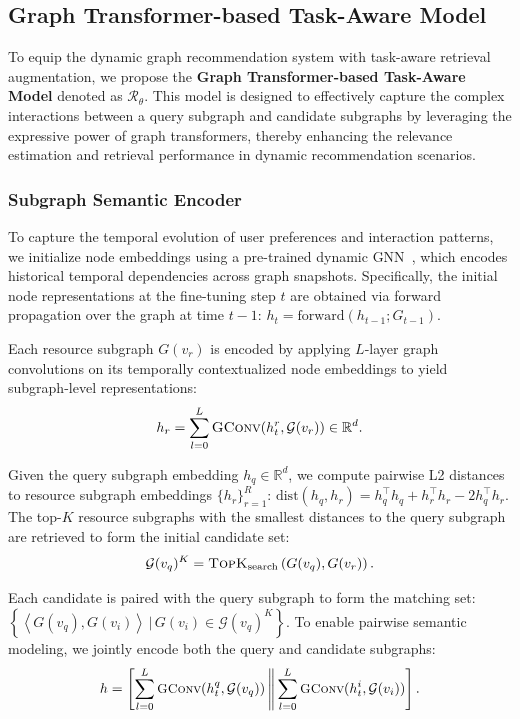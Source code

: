 \documentclass[letterpaper]{article} %
\begin{document}
\subsection{Graph Transformer-based Task-Aware Model}
\label{GTransTAM}
To equip the dynamic graph recommendation system with task-aware retrieval augmentation, we propose the \textbf{Graph Transformer-based Task-Aware Model} denoted as $\mathcal{R}_\theta$. This model is designed to effectively capture the complex interactions between a query subgraph and candidate subgraphs by leveraging the expressive power of graph transformers, thereby enhancing the relevance estimation and retrieval performance in dynamic recommendation scenarios.

\subsubsection{Subgraph Semantic Encoder}
To capture the temporal evolution of user preferences and interaction patterns, we initialize node embeddings using a pre-trained dynamic GNN~\cite{yang2024graphpro}, which encodes historical temporal dependencies across graph snapshots. Specifically, the initial node representations at the fine-tuning step $t$ are obtained via forward propagation over the graph at time $t-1$: ${h}_t = \text{forward}({h}_{t-1}; G_{t-1})$.

Each resource subgraph $G(v_r)$ is encoded by applying $L$-layer graph convolutions on its temporally contextualized node embeddings to yield subgraph-level representations:
\begin{equation}\label{subgraph_rep} 
h_r = \sum_{l=0}^L \textsc{GConv}(h_t^r, \mathcal{G}(v_r)) \in \mathbb{R}^d.
\end{equation}

Given the query subgraph embedding $h_q \in \mathbb{R}^d$, we compute pairwise L2 distances to resource subgraph embeddings $\{ h_r \}_{r=1}^R$: $\mathrm{dist}({h}_q, {h}_r) = {h}_q^\top {h}_q + {h}_r^\top {h}_r - 2 {h}_q^\top {h}_r$. The top-$K$ resource subgraphs with the smallest distances to the query subgraph are retrieved to form the initial candidate set:
\begin{equation}
\mathcal{G}(v_q)^K = \textsc{TopK}_{\text{search}} \left( {G}(v_q), {G}(v_r) \right).
\end{equation}

Each candidate is paired with the query subgraph to form the matching set: $\left\{ \left\langle {G}(v_q), {G}(v_i) \right\rangle \,|\, {G}(v_i) \in \mathcal{G}(v_q)^K \right\}$. To enable pairwise semantic modeling, we jointly encode both the query and candidate subgraphs:
\begin{equation}
\small
{h} = \left[ \sum_{l=0}^L \textsc{GConv}(h_t^q, \mathcal{G}(v_q)) \,\middle\|\, \sum_{l=0}^L \textsc{GConv}(h_t^i, \mathcal{G}(v_i)) \right].
\end{equation}
\end{document}
